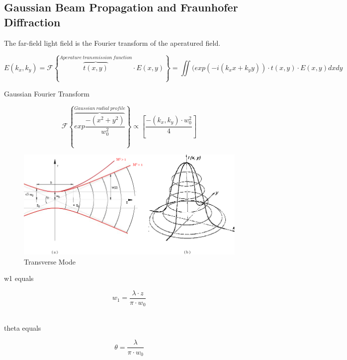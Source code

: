 \subsection{Gaussian Beam Propagation and Fraunhofer Diffraction}
	\label{diffraction}
	
The far-field light field is the Fourier transform of the aperatured field.
	
\begin{equation} 
E(k_{x},k_{y}) = \mathcal{F}\left\{{\overbrace{t(x,y)}^{Aperature\  transmission\  function}\cdot E(x,y)}\right\} = \iint(exp(-i(k_{x} x + k_{y}y))\cdot t(x,y)\cdot E(x,y)dxdy 
\end{equation} 

Gaussian Fourier Transform

\begin{equation} 
\mathcal{F}\left\{{\overbrace{exp \frac{-(x^{2} + y^{2})}{w^{2}_{0}}}^{Gaussian\ radial\ profile}} \right\} \propto\left[\frac{-(k_{x},k_{y})\cdot w^{2}_{0}}{4}\right]
\end{equation}

\begin{figure} [ht]
\centering
\includegraphics[scale=0.5]{chapters/img/TEM00.png}	
\caption{Transverse Mode}
\label{laser_power}
\end{figure}

w1 equals

\begin{equation}
w_{1} = \frac{\lambda \cdot z}{\pi\cdot w_{0}}
\end{equation}
\

theta equals

\begin{equation}
\theta = \frac{\lambda}{\pi\cdot w_{0}}
\end{equation}
\

